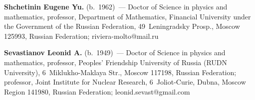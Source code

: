 

\Contr

\noindent
\textbf{Shchetinin Eugene Yu.} (b.\ 1962)~--- Doctor of Science in physics and mathematics, 
professor, Department of Mathematics, Financial University under the Government of the Russian 
Federation, 49~Leningradsky Prosp., Moscow 125993, Russian Federation;  
\mbox{riviera-molto@mail.ru}

\vspace*{3pt}

\noindent
\textbf{Sevastianov Leonid A.} (b.\ 1949)~--- Doctor of Science in physics and mathematics, 
professor, Peoples' Friendship University of Russia (RUDN University), 6~Miklukho-Maklaya Str., 
Moscow 117198, Russian Federation; professor, Joint Institute for Nuclear Research,  
6~Joliot-Curie, Dubna, Moscow Region 141980, Russian Federation; 
\mbox{leonid.sevast@gmail.com}



\label{end\stat}

\renewcommand{\bibname}{\protect\rm Литература}